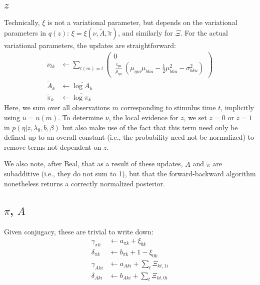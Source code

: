 \documentclass[11pt]{article}
\begin{document}
\subsection{$z$}
Technically, $\xi$ is not a variational parameter, but depends on the variational parameters in $q(z)$: $\xi = \xi(\nu, \tilde{A}, \tilde{\pi})$, and similarly for $\Xi$. For the actual variational parameters, the updates are straightforward:
\begin{align}
    \nu_{tk} &\leftarrow \sum_{t(m) = t} 
    \begin{pmatrix}
        0 \\
        \frac{\varsigma_{\eta u}}{\rho_{\eta u}} \left(
        \mu_{\eta m}\mu_{bku} - \frac{1}{2} \mu_{bku}^2 
        - \sigma^2_{bku} \right)
    \end{pmatrix} \\
    \tilde{A}_{k} &\leftarrow \overline{\log A_k} \\
    \tilde{\pi}_k &\leftarrow \overline{\log \pi_k}
\end{align}
Here, we sum over all observations $m$ corresponding to stimulus time $t$, implicitly using $u = u(m)$. To determine $\nu$, the local evidence for $z$, we set $z = 0$ or $z = 1$ in $p(\eta|z, \lambda_0, b, \beta)$ but also make use of the fact that this term need only be defined up to an overall constant (i.e., the probability need not be normalized) to remove terms not dependent on $z$. 

We also note, after Beal, that as a result of these updates, $\tilde{A}$ and $\tilde{\pi}$ are subadditive (i.e., they do not sum to 1), but that the forward-backward algorithm nonetheless returns a correctly normalized posterior.

\subsection{$\pi$, $A$}
Given conjugacy, these are trivial to write down:
\begin{align}
    \gamma_{\pi k} &\leftarrow a_{\pi k} + \xi_{0k} \\
    \delta_{\pi k} &\leftarrow b_{\pi k} + 1 - \xi_{0k} \\
    \gamma_{A ki} &\leftarrow a_{A ki} + \sum_t \Xi_{kt, 1i} \\
    \delta_{A ki} &\leftarrow b_{A ki} + \sum_t \Xi_{kt, 0i} 
\end{align}
\end{document}
